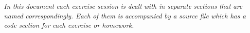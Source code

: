 \documentclass{res/theme}
\subtitle{Bruno Vandekerkhove}
\date{}
\begin{document}
\maketitle


\begin{center}\textit{In this document each exercise session is dealt with in separate sections that are named correspondingly. Each of them is accompanied by a source file which has a code section for each exercise or homework.}\end{center}

\tableofcontents





\end{document}
